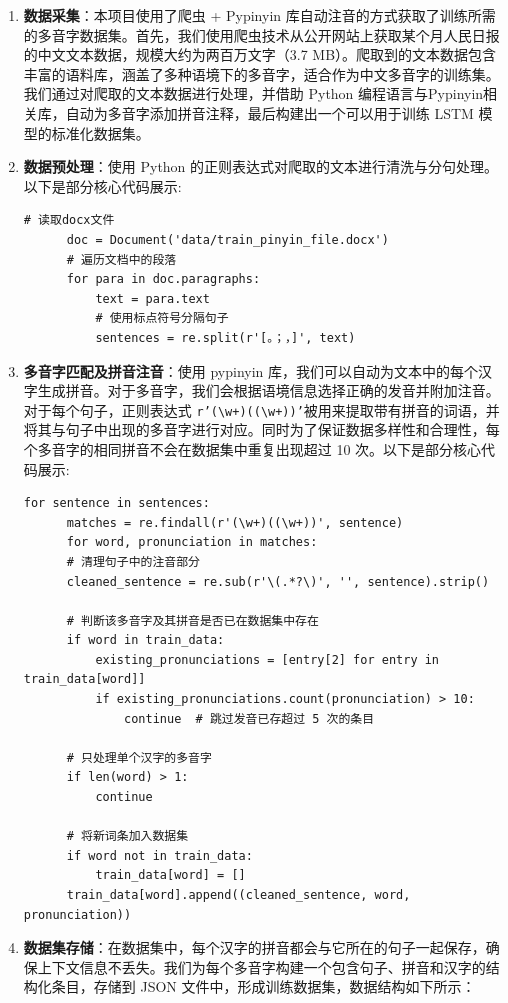 \documentclass[12pt,hyperref,a4paper,UTF8]{ctexart}
\begin{document}
\begin{enumerate}
    \item \textbf{数据采集}：本项目使用了爬虫 + Pypinyin 库自动注音的方式获取了训练所需的多音字数据集。首先，我们使用爬虫技术从公开网站上获取某个月人民日报的中文文本数据，规模大约为两百万文字（3.7 MB）。爬取到的文本数据包含丰富的语料库，涵盖了多种语境下的多音字，适合作为中文多音字的训练集。我们通过对爬取的文本数据进行处理，并借助 Python 编程语言与Pypinyin相关库，自动为多音字添加拼音注释，最后构建出一个可以用于训练 LSTM 模型的标准化数据集。
    \item \textbf{数据预处理}：使用 Python 的正则表达式对爬取的文本进行清洗与分句处理。以下是部分核心代码展示:
  \begin{lstlisting}[caption={方法一数据预处理}, label={lst:example}]
      # 读取docx文件
      doc = Document('data/train_pinyin_file.docx')
      # 遍历文档中的段落
      for para in doc.paragraphs:
          text = para.text
          # 使用标点符号分隔句子
          sentences = re.split(r'[。；，]', text)
  \end{lstlisting}
    \item \textbf{多音字匹配及拼音注音}：使用 pypinyin 库，我们可以自动为文本中的每个汉字生成拼音。对于多音字，我们会根据语境信息选择正确的发音并附加注音。对于每个句子，正则表达式 \texttt{r'(\textbackslash w+)((\textbackslash w+))'}被用来提取带有拼音的词语，并将其与句子中出现的多音字进行对应。同时为了保证数据多样性和合理性，每个多音字的相同拼音不会在数据集中重复出现超过 10 次。以下是部分核心代码展示:
  \begin{lstlisting}[caption={方法一多音字匹配及拼音注音}, label={lst:example}]
  for sentence in sentences:
      matches = re.findall(r'(\w+)((\w+))', sentence)
      for word, pronunciation in matches:
      # 清理句子中的注音部分
      cleaned_sentence = re.sub(r'\(.*?\)', '', sentence).strip()
      
      # 判断该多音字及其拼音是否已在数据集中存在
      if word in train_data:
          existing_pronunciations = [entry[2] for entry in train_data[word]]
          if existing_pronunciations.count(pronunciation) > 10:
              continue  # 跳过发音已存超过 5 次的条目
      
      # 只处理单个汉字的多音字
      if len(word) > 1:
          continue
  
      # 将新词条加入数据集
      if word not in train_data:
          train_data[word] = []
      train_data[word].append((cleaned_sentence, word, pronunciation))
  \end{lstlisting}
  \item \textbf{数据集存储}：在数据集中，每个汉字的拼音都会与它所在的句子一起保存，确保上下文信息不丢失。我们为每个多音字构建一个包含句子、拼音和汉字的结构化条目，存储到 JSON 文件中，形成训练数据集，数据结构如下所示：
  

\end{enumerate}
\end{document}
